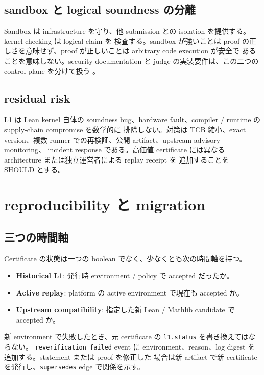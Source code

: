 \documentclass[a4paper,11pt]{ltjsarticle}
\newcommand{\term}[1]{\textbf{\color{TFNavy}#1}}
\newcommand{\code}[1]{\texttt{#1}}
\begin{document}
\subsection{sandbox と logical soundness の分離}

Sandbox は infrastructure を守り、他 submission との isolation を提供する。kernel checking は logical claim を
検査する。sandbox が強いことは proof の正しさを意味せず、proof が正しいことは arbitrary code execution が安全で
あることを意味しない。security documentation と judge の実装要件は、この二つの control plane を分けて扱う
\cite{tfsecurity,tfjudging}。

\subsection{residual risk}

L1 は Lean kernel 自体の soundness bug、hardware fault、compiler / runtime の supply-chain compromise を数学的に
排除しない。対策は TCB 縮小、exact version、複数 runner での再検証、公開 artifact、upstream advisory monitoring、
incident response である。高価値 certificate には異なる architecture または独立運営者による replay receipt を
追加することを SHOULD とする。

\section{reproducibility と migration}

\subsection{三つの時間軸}

Certificate の状態は一つの boolean でなく、少なくとも次の時間軸を持つ。

\begin{itemize}
  \item \term{Historical L1}: 発行時 environment / policy で accepted だったか。
  \item \term{Active replay}: platform の active environment で現在も accepted か。
  \item \term{Upstream compatibility}: 指定した新 Lean / Mathlib candidate で accepted か。
\end{itemize}

新 environment で失敗したとき、元 certificate の \code{l1.status} を書き換えてはならない。
\code{reverification\_failed} event に environment、reason、log digest を追加する。statement または proof を修正した
場合は新 artifact で新 certificate を発行し、\code{supersedes} edge で関係を示す。
\end{document}
